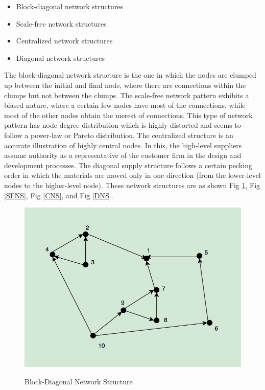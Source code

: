 \begin{itemize}
    \item Block-diagonal network structures
    \item Scale-free network structures
    \item Centralized network structures
    \item Diagonal network structures
\end{itemize}

The block-diagonal network structure is the one in which the nodes are clumped up between the initial and final node, where there are connections within the clumps but not between the clumps. The scale-free network pattern exhibits a biased nature, where a certain few nodes have most of the connections, while most of the other nodes obtain the merest of connections. This type of network pattern has node degree distribution which is highly distorted and seems to follow a power-law or Pareto distribution. The centralized structure is an accurate illustration of highly central nodes. In this, the high-level suppliers assume authority as a representative of the customer firm in the design and development processes. The diagonal supply structure follows a certain pecking order in which the materials are moved only in one direction (from the lower-level nodes to the higher-level node). These network structures are as shown Fig \ref{BDNS}, Fig \ref{SFNS}, Fig \ref{CNS}, and Fig \ref{DNS}.

\begin{figure}[H]
  \centering
  \includegraphics[width=4.5in]{figures/pdf/Block-diagonal.png}\\
  \caption{Block-Diagonal Network Structure} \label{BDNS}
\end{figure}

